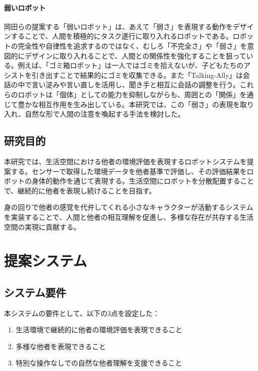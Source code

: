 \documentclass{cuxarticle}
\begin{document}
\subsubsection{弱いロボット}
岡田らの提案する「弱いロボット」\cite{岡田-2017-弱いロボ}は、あえて「弱さ」を表現する動作をデザインすることで、人間を積極的にタスク遂行に取り入れるロボットである。ロボットの完全性や自律性を追求するのではなく、むしろ「不完全さ」や「弱さ」を意図的にデザインに取り入れることで、人間との関係性を強化することを狙っている。例えば、「ゴミ箱ロボット」\cite{岡田美智男-2012-ゴミ箱ロ}は一人ではゴミを拾えないが、子どもたちのアシストを引き出すことで結果的にゴミを収集できる。また「Talking-Ally」\cite{岡田美智男-2012-ゴミ箱ロ}は会話の中で言い淀みや言い直しを活用し、聞き手と相互に会話の調整を行う。これらのロボットは「個体」としての能力を抑制しながらも、周囲との「関係」を通じて豊かな相互作用を生み出している。本研究では、この「弱さ」の表現を取り入れ、自然な形で人間の注意を喚起する手法を検討した。

\section{研究目的}
本研究では、生活空間における他者の環境評価を表現するロボットシステムを提案する。センサーで取得した環境データを他者基準で評価し、その評価結果をロボットの身体的動作を通じて表現する。生活空間にロボットを分散配置することで、継続的に他者を表現し続けることを目指す。

身の回りで他者の感覚を代弁してくれる小さなキャラクターが活動するシステムを実装することで、人間と他者の相互理解を促進し、多様な存在が共存する生活空間の実現に貢献する。

\chapter{提案システム}

\section{システム要件}
本システムの要件として、以下の3点を設定した：

\begin{enumerate}
  \item 生活環境で継続的に他者の環境評価を表現できること
  \item 多様な他者を表現できること
  \item 特別な操作なしでの自然な他者理解を支援できること
\end{enumerate}
\end{document}
